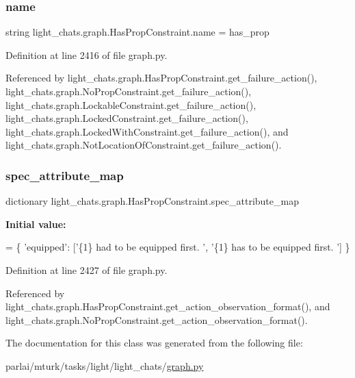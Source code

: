 \subsubsection{\texorpdfstring{name}{name}}
{\footnotesize\ttfamily string light\+\_\+chats.\+graph.\+Has\+Prop\+Constraint.\+name = \textquotesingle{}has\+\_\+prop\textquotesingle{}\hspace{0.3cm}{\ttfamily [static]}}



Definition at line 2416 of file graph.\+py.



Referenced by light\+\_\+chats.\+graph.\+Has\+Prop\+Constraint.\+get\+\_\+failure\+\_\+action(), light\+\_\+chats.\+graph.\+No\+Prop\+Constraint.\+get\+\_\+failure\+\_\+action(), light\+\_\+chats.\+graph.\+Lockable\+Constraint.\+get\+\_\+failure\+\_\+action(), light\+\_\+chats.\+graph.\+Locked\+Constraint.\+get\+\_\+failure\+\_\+action(), light\+\_\+chats.\+graph.\+Locked\+With\+Constraint.\+get\+\_\+failure\+\_\+action(), and light\+\_\+chats.\+graph.\+Not\+Location\+Of\+Constraint.\+get\+\_\+failure\+\_\+action().

\mbox{\label{classlight__chats_1_1graph_1_1HasPropConstraint_a049145fe41d33a2103d0f319b1b8248e}} 
\subsubsection{\texorpdfstring{spec\+\_\+attribute\+\_\+map}{spec\_attribute\_map}}
{\footnotesize\ttfamily dictionary light\+\_\+chats.\+graph.\+Has\+Prop\+Constraint.\+spec\+\_\+attribute\+\_\+map\hspace{0.3cm}{\ttfamily [static]}}

{\bfseries Initial value\+:}
\begin{DoxyCode}
=  \{
        \textcolor{stringliteral}{'equipped'}: [\textcolor{stringliteral}{'\{1\} had to be equipped first. '}, \textcolor{stringliteral}{'\{1\} has to be equipped first. '}]
    \}
\end{DoxyCode}


Definition at line 2427 of file graph.\+py.



Referenced by light\+\_\+chats.\+graph.\+Has\+Prop\+Constraint.\+get\+\_\+action\+\_\+observation\+\_\+format(), and light\+\_\+chats.\+graph.\+No\+Prop\+Constraint.\+get\+\_\+action\+\_\+observation\+\_\+format().



The documentation for this class was generated from the following file\+:\begin{DoxyCompactItemize}
\item 
parlai/mturk/tasks/light/light\+\_\+chats/\hyperlink{parlai_2mturk_2tasks_2light_2light__chats_2graph_8py}{graph.\+py}\end{DoxyCompactItemize}
